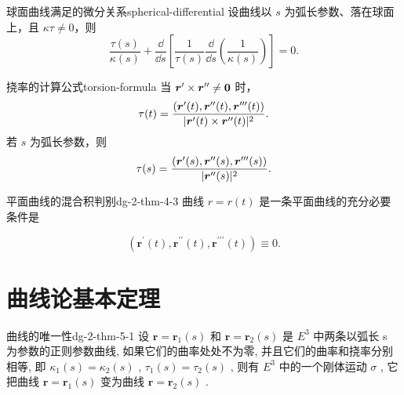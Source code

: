 \begin{proposition}{球面曲线满足的微分关系}{spherical-differential}
设曲线以 $s$ 为弧长参数、落在球面上，且 $\kappa\tau\neq0$，则
\[
\frac{\tau(s)}{\kappa(s)}+
\frac{\dd}{\dd s}\left[
\frac1{\tau(s)}\frac{\dd}{\dd s}\left(\frac1{\kappa(s)}\right)\right]=0.
\]
\end{proposition}

\begin{proposition}{挠率的计算公式}{torsion-formula}
当 $\boldsymbol{r}'\times\boldsymbol{r}''\neq\boldsymbol{0}$ 时，
\[
\tau(t)=\frac{(\boldsymbol{r}'(t),\boldsymbol{r}''(t),\boldsymbol{r}'''(t))}
{|\boldsymbol{r}'(t)\times\boldsymbol{r}''(t)|^2}.
\]
若 $s$ 为弧长参数，则
\[
\tau(s)=\frac{(\boldsymbol{r}'(s),\boldsymbol{r}''(s),\boldsymbol{r}'''(s))}{|\boldsymbol{r}''(s)|^2}.
\]
\end{proposition}

\begin{theorem}{平面曲线的混合积判别}{dg-2-thm-4-3}
曲线 \(r = r(t)\) 是一条平面曲线的充分必要条件是\par

\begin{equation*}
(\boldsymbol {r} ^ {\prime} (t), \boldsymbol {r} ^ {\prime \prime} (t), \boldsymbol {r} ^ {\prime \prime \prime} (t)) \equiv 0.
\end{equation*}
\end{theorem}

\section{曲线论基本定理}

\begin{theorem}{曲线的唯一性}{dg-2-thm-5-1}
设  \(\boldsymbol{r} = \boldsymbol{r}_{1}(s)\)  和  \(\boldsymbol{r} = \boldsymbol{r}_{2}(s)\)  是  \(E^{3}\)  中两条以弧长 s 为参数的正则参数曲线, 如果它们的曲率处处不为零, 并且它们的曲率和挠率分别相等, 即  \(\kappa_{1}(s) = \kappa_{2}(s)\) ,  \(\tau_{1}(s) = \tau_{2}(s)\) , 则有  \(E^{3}\)  中的一个刚体运动  \(\sigma\) , 它把曲线  \(\boldsymbol{r} = \boldsymbol{r}_{1}(s)\)  变为曲线  \(\boldsymbol{r} = \boldsymbol{r}_{2}(s)\) .
\end{theorem}


